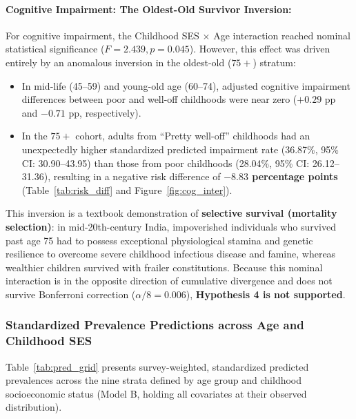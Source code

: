 \paragraph{Cognitive Impairment: The Oldest-Old Survivor Inversion:}
For cognitive impairment, the Childhood SES $\times$ Age interaction reached nominal statistical significance ($F = 2.439, p = 0.045$). However, this effect was driven entirely by an anomalous inversion in the oldest-old ($75+$) stratum:
\begin{itemize}
    \item In mid-life (45--59) and young-old age (60--74), adjusted cognitive impairment differences between poor and well-off childhoods were near zero ($+0.29$ pp and $-0.71$ pp, respectively).
    \item In the $75+$ cohort, adults from ``Pretty well-off'' childhoods had an unexpectedly higher standardized predicted impairment rate (36.87\%, 95\% CI: 30.90--43.95) than those from poor childhoods (28.04\%, 95\% CI: 26.12--31.36), resulting in a negative risk difference of \textbf{$-8.83$ percentage points} (Table~\ref{tab:risk_diff} and Figure~\ref{fig:cog_inter}).
\end{itemize}
This inversion is a textbook demonstration of \textbf{selective survival (mortality selection)}: in mid-20th-century India, impoverished individuals who survived past age 75 had to possess exceptional physiological stamina and genetic resilience to overcome severe childhood infectious disease and famine, whereas wealthier children survived with frailer constitutions. Because this nominal interaction is in the opposite direction of cumulative divergence and does not survive Bonferroni correction ($\alpha / 8 = 0.006$), \textbf{Hypothesis 4 is not supported}.

\subsubsection*{Standardized Prevalence Predictions across Age and Childhood SES}
Table~\ref{tab:pred_grid} presents survey-weighted, standardized predicted prevalences across the nine strata defined by age group and childhood socioeconomic status (Model B, holding all covariates at their observed distribution).

